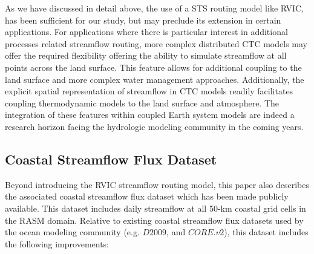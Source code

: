 \documentclass[jgrga, draft]{agutex}
\begin{document}
\begin{article}
As we have discussed in detail above, the use of a STS routing model like RVIC, has been sufficient for our study, but may preclude its extension in certain applications.
For applications where there is particular interest in additional processes related streamflow routing, more complex distributed CTC models may offer the required flexibility offering the ability to simulate streamflow at all points across the land surface.
This feature allows for additional coupling to the land surface and more complex water management approaches.
Additionally, the explicit spatial representation of streamflow in CTC models readily facilitates coupling thermodynamic models to the land surface and atmosphere.
The integration of these features within coupled Earth system models are indeed a research horizon facing the hydrologic modeling community in the coming years.

\subsection{Coastal Streamflow Flux Dataset}
Beyond introducing the RVIC streamflow routing model, this paper also describes the associated coastal streamflow flux dataset which has been made publicly available.
This dataset includes daily streamflow at all 50-km coastal grid cells in the RASM domain.
Relative to existing coastal streamflow flux datasets used by the ocean modeling community (e.g. $D2009$, and $CORE.v2$), this dataset includes the following improvements:


\end{article}
\end{document}
